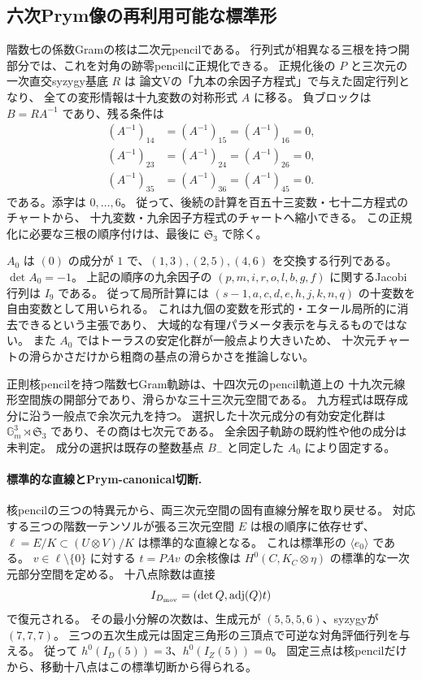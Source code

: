\subsection*{六次Prym像の再利用可能な標準形}

階数七の係数Gramの核は二次元pencilである。
行列式が相異なる三根を持つ開部分では、これを対角の跡零pencilに正規化できる。
正規化後の $P$ と三次元の一次直交syzygy基底 $R$ は
論文Vの「九本の余因子方程式」で与えた固定行列となり、
全ての変形情報は十九変数の対称形式 $A$ に移る。
負ブロックは $B=RA^{-1}$ であり、残る条件は
\[
 \begin{aligned}
 (A^{-1})_{14}&=(A^{-1})_{15}=(A^{-1})_{16}=0,\\
 (A^{-1})_{23}&=(A^{-1})_{24}=(A^{-1})_{26}=0,\\
 (A^{-1})_{35}&=(A^{-1})_{36}=(A^{-1})_{45}=0.
 \end{aligned}
\]
である。添字は $0,\ldots,6$。
従って、後続の計算を百五十三変数・七十二方程式のチャートから、
十九変数・九余因子方程式のチャートへ縮小できる。
この正規化に必要な三根の順序付けは、最後に $\mathfrak S_3$ で除く。

$A_0$ は $(0)$ の成分が $1$ で、$(1,3),(2,5),(4,6)$ を交換する行列である。
$\det A_0=-1$。
上記の順序の九余因子の $(p,m,i,r,o,l,b,g,f)$ に関するJacobi行列は $I_9$ である。
従って局所計算には $(s-1,a,c,d,e,h,j,k,n,q)$ の十変数を自由変数として用いられる。
これは九個の変数を形式的・エタール局所的に消去できるという主張であり、
大域的な有理パラメータ表示を与えるものではない。
また $A_0$ ではトーラスの安定化群が一般点より大きいため、
十次元チャートの滑らかさだけから粗商の基点の滑らかさを推論しない。

正則核pencilを持つ階数七Gram軌跡は、十四次元のpencil軌道上の
十九次元線形空間族の開部分であり、滑らかな三十三次元空間である。
九方程式は既存成分に沿う一般点で余次元九を持つ。
選択した十次元成分の有効安定化群は
$\mathbb G_m^3\rtimes\mathfrak S_3$ であり、その商は七次元である。
全余因子軌跡の既約性や他の成分は未判定。
成分の選択は既存の整数基点 $B_-$ と同定した $A_0$ により固定する。

\paragraph{標準的な直線とPrym-canonical切断.}
核pencilの三つの特異元から、両三次元空間の固有直線分解を取り戻せる。
対応する三つの階数一テンソルが張る三次元空間 $E$ は根の順序に依存せず、
$\ell=E/K\subset (U\otimes V)/K$ は標準的な直線となる。
これは標準形の $\langle e_0\rangle$ である。
$v\in\ell\setminus\{0\}$ に対する $t=PAv$ の余核像は
$H^0(C,K_C\otimes\eta)$ の標準的な一次元部分空間を定める。
十八点除数は直接
\[
 I_{D_{\rm mov}}=(\det Q,\operatorname{adj}(Q)t)
\]
で復元される。
その最小分解の次数は、生成元が $(5,5,5,6)$、syzygyが $(7,7,7)$。
三つの五次生成元は固定三角形の三頂点で可逆な対角評価行列を与える。
従って $h^0(I_D(5))=3$、$h^0(I_Z(5))=0$。
固定三点は核pencilだけから、移動十八点はこの標準切断から得られる。


